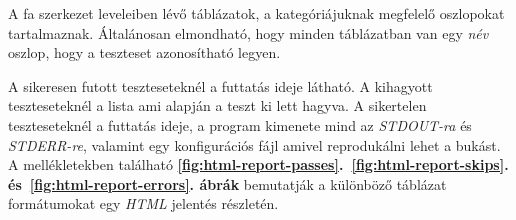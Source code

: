         A fa szerkezet leveleiben lévő táblázatok, a kategóriájuknak megfelelő oszlopokat tartalmaznak. Általánosan
        elmondható, hogy minden táblázatban van egy \emph{név} oszlop, hogy a teszteset azonosítható legyen.

        A sikeresen futott teszteseteknél a futtatás ideje látható. A kihagyott teszteseteknél a lista ami alapján a
        teszt ki lett hagyva. A sikertelen teszteseteknél a futtatás ideje, a program kimenete mind az
        \textit{STDOUT-ra} és \textit{STDERR-re}, valamint egy konfigurációs fájl amivel reprodukálni lehet a bukást. A
        mellékletekben található \textbf{\ref{fig:html-report-passes}.~\ref{fig:html-report-skips}.
        és~\ref{fig:html-report-errors}. ábrák} bemutatják a különböző táblázat formátumokat egy \textit{HTML} jelentés
        részletén.
